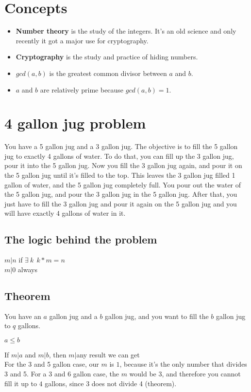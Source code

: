\documentclass{article}
\begin{document}
	\section{Concepts}
	\begin{itemize}
		\item \textbf{Number theory} is the study of the integers. It's an old science and only recently it got a major use for cryptography.
		\item \textbf{Cryptography} is the study and practice of hiding numbers.
		\item $gcd(a, b)$ is the greatest common divisor between $a$ and $b$.
		\item $a$ and $b$ are relatively prime because $gcd(a, b) = 1$.
	\end{itemize}
	
	\section{4 gallon jug problem}
	You have a 5 gallon jug and a 3 gallon jug. The objective is to fill the 5 gallon jug to exactly 4 gallons of water. To do that, you can fill up the 3 gallon jug, pour it into the 5 gallon jug. Now you fill the 3 gallon jug again, and pour it on the 5 gallon jug until it's filled to the top. This leaves the 3 gallon jug filled 1 gallon of water, and the 5 gallon jug completely full. You pour out the water of the 5 gallon jug, and pour the 3 gallon jug in the 5 gallon jug. After that, you just have to fill the 3 gallon jug and pour it again on the 5 gallon jug and you will have exactly 4 gallons of water in it.
	
	\subsection{The logic behind the problem}
	$m | n$ if $\exists\ k\ \ k * m = n$\\
	$m | 0$ always
	
	\subsection{Theorem}
	You have an $a$ gallon jug and a $b$ gallon jug, and you want to fill the $b$ gallon jug to $q$ gallons.
	
	$a \leq b$
	
	If $m | a$ and $m | b$, then $m|$any result we can get
	\\
	For the 3 and 5 gallon case, our $m$ is $1$, because it's the only number that divides 3 and 5. For a 3 and 6 gallon case, the $m$ would be $3$, and therefore you cannot fill it up to $4$ gallons, since 3 does not divide 4 (theorem).
	
\end{document}
